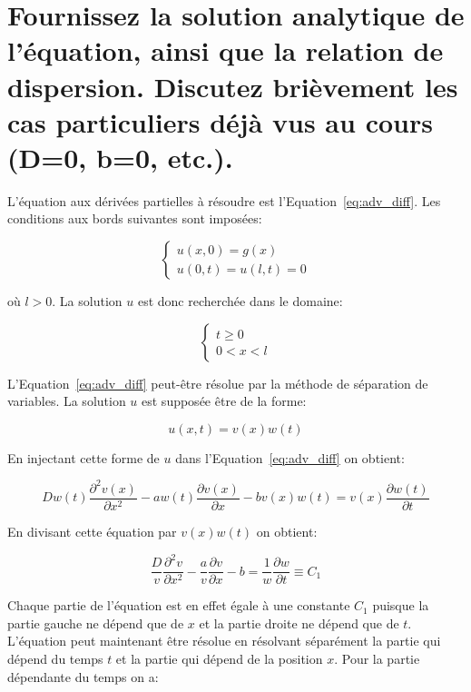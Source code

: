 \documentclass[a4paper, 12pt]{report}
\begin{document}
\section{Fournissez la solution analytique de l'équation, ainsi que la relation
de dispersion. Discutez brièvement les cas particuliers déjà vus au cours (D=0, b=0, etc.).}

L'équation aux dérivées partielles à résoudre est l'Equation~\ref{eq:adv_diff}. Les conditions
aux bords suivantes sont imposées:

\begin{equation}
  \left \{
  \begin{aligned}
    u(x,0) = g(x)\\
    u(0,t) = u(l,t) = 0
  \end{aligned}
  \right.
\end{equation}

où $l > 0$. La solution $u$ est donc recherchée dans le domaine:

\begin{equation}
  \left \{
  \begin{aligned}
    t \ge 0\\
    0 < x < l
  \end{aligned}
  \right.
\end{equation}

L'Equation~\ref{eq:adv_diff} peut-être résolue par la méthode de séparation de
variables. La solution $u$ est supposée être de la forme:

\begin{equation}
  u(x,t) = v(x) w(t)
\end{equation}

En injectant cette forme de $u$ dans l'Equation~\ref{eq:adv_diff} on obtient:

\begin{equation}
D w(t) \frac{\partial^2 v(x)}{\partial x^2} - a w(t) \frac{\partial v(x)}{\partial x} - b v(x) w(t) = v(x) \frac{\partial w(t)}{\partial t}
\end{equation}

En divisant cette équation par $v(x) w(t)$ on obtient:

\begin{equation}
  \frac{D}{v} \frac{\partial^2 v}{\partial x^2} - \frac{a}{v} \frac{\partial v}{\partial x} -b = \frac{1}{w} \frac{\partial w}{\partial t} \equiv C_1
\end{equation}

Chaque partie de l'équation est en effet égale à une constante $C_1$ puisque
la partie gauche ne dépend que de $x$ et la partie droite ne dépend que de $t$.
L'équation peut maintenant être résolue en résolvant séparément la partie
qui dépend du temps $t$ et la partie qui dépend de la position $x$. Pour la
partie dépendante du temps on a:
\end{document}
